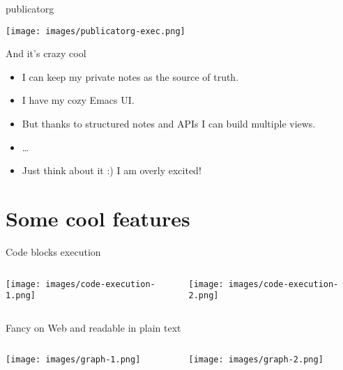\documentclass[presentation,aspectratio=169,smaller]{beamer}
\begin{document}
\begin{frame}[label={sec:orgb4b25d5}]{publicatorg}
\begin{center}
\texttt{[image: images/publicatorg-exec.png]}
\end{center}
\end{frame}

\begin{frame}[label={sec:org3361d12}]{And it's crazy cool}
\begin{itemize}
\item I can keep my private notes as the source of truth.
\item I have my cozy Emacs UI.
\item But thanks to structured notes and APIs I can build multiple views.
\item \ldots{}
\item Just think about it :) I am overly excited!
\end{itemize}
\end{frame}

\section{Some cool features}
\label{sec:orgfab5220}

\begin{frame}[label={sec:org996143e}]{Code blocks execution}
\begin{columns}
\begin{column}{0.5\columnwidth}
\begin{center}
\texttt{[image: images/code-execution-1.png]}
\end{center}
\end{column}

\begin{column}{0.5\columnwidth}
\begin{center}
\texttt{[image: images/code-execution-2.png]}
\end{center}
\end{column}
\end{columns}
\end{frame}

\begin{frame}[label={sec:org4afd33f}]{Fancy on Web and readable in plain text}
\begin{columns}
\begin{column}{0.5\columnwidth}
\begin{center}
\texttt{[image: images/graph-1.png]}
\end{center}
\end{column}

\begin{column}{0.5\columnwidth}
\begin{center}
\texttt{[image: images/graph-2.png]}
\end{center}
\end{column}
\end{columns}
\end{frame}
\end{document}
